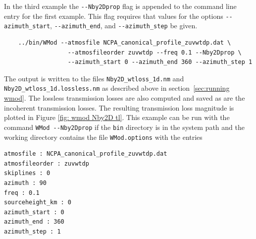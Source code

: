 In the third example the \verb+--Nby2Dprop+ flag is appended to the command line entry for the first example. This flag requires that values for the options \verb+--azimuth_start+, \verb+--azimuth_end+, and \verb+--azimuth_step+ be given. 
\begin{verbatim} 
    ../bin/WMod --atmosfile NCPA_canonical_profile_zuvwtdp.dat \
                  --atmosfileorder zuvwtdp --freq 0.1 --Nby2Dprop \
                  --azimuth_start 0 --azimuth_end 360 --azimuth_step 1
\end{verbatim}
The output is written to the files \verb+Nby2D_wtloss_1d.nm+ and \verb+Nby2D_wtloss_1d.lossless.nm+ as described above in section~\ref{sec:running wmod}. The lossless transmission losses are also computed and saved as are the incoherent transmission losses. The resulting transmission loss magnitude is plotted in Figure \ref{fig: wmod Nby2D tl}. This example can be run with the command \verb+WMod --Nby2Dprop+ if the \verb+bin+ directory is in the system path and the working directory contains the file \verb+WMod.options+ with the entries 
\begin{verbatim}
atmosfile : NCPA_canonical_profile_zuvwtdp.dat
atmosfileorder : zuvwtdp
skiplines : 0
azimuth : 90
freq : 0.1
sourceheight_km : 0
azimuth_start : 0 
azimuth_end : 360 
azimuth_step : 1
\end{verbatim}



